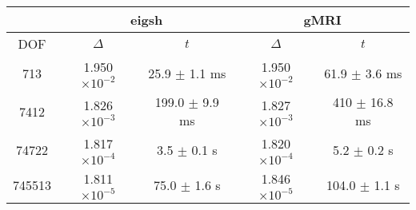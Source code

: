 \centering
\renewcommand{\arraystretch}{1.1}
\begin{tabular}{@{}c|cc|cc@{}}
    \toprule
     & \multicolumn{2}{c|}{eigsh} & \multicolumn{2}{c}{gMRI} \\
    \midrule
    DOF & $\Delta$ & $t$ & $\Delta$ & $t$ \\
    \midrule
    713 & 1.950 $\times 10^{-2}$ & 25.9 $\pm$ 1.1 ms & 1.950 $\times 10^{-2}$ & 61.9 $\pm$ 3.6 ms \\
    7412 & 1.826 $\times 10^{-3}$ & 199.0 $\pm$ 9.9 ms & 1.827 $\times 10^{-3}$ & 410 $\pm$ 16.8 ms \\
    74722 & 1.817 $\times 10^{-4}$ & 3.5 $\pm$ 0.1 s & 1.820 $\times 10^{-4}$ & 5.2 $\pm$ 0.2 s \\
    745513 & 1.811 $\times 10^{-5}$ & 75.0 $\pm$ 1.6 s & 1.846 $\times 10^{-5}$ & 104.0 $\pm$ 1.1 s \\
    \bottomrule
\end{tabular}